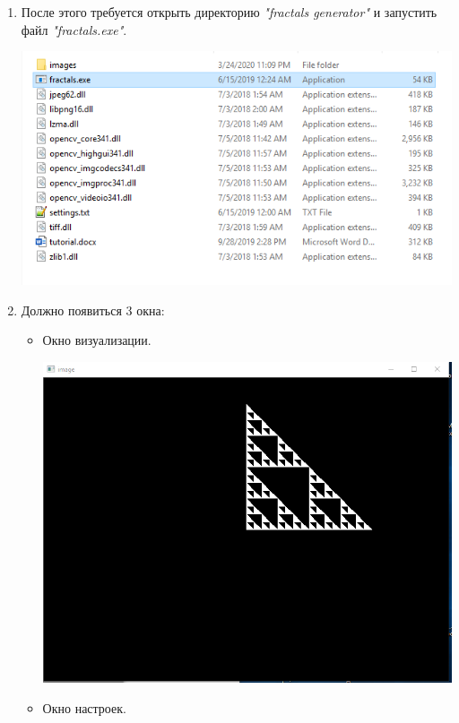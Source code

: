 \documentclass[a4paper,12pt,preview]{report} %
\begin{document}
\begin{enumerate}
		\item После этого требуется открыть директорию \textit{"fractals generator"} и запустить файл \textit{"fractals.exe"}.
		
		\includegraphics[scale=0.6]{Capture3.PNG}
		
		\item Должно появиться 3 окна:
		\begin{itemize}
			\item Окно визуализации.
			
			\includegraphics[scale=0.5]{Capture4.PNG}
			
			\item Окно настроек.
			

\end{itemize}
\end{enumerate}
\end{document}
